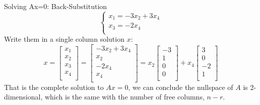 \documentclass{beamer}
\begin{document}
\begin{frame}{Solving Ax=0: Back-Substitution}
\begin{equation*}
    \begin{cases}
        x_1=-3x_2+3x_4\\
        x_3=-2x_4\\
    \end{cases}
\end{equation*}
Write them in a single column solution $x$:
\begin{equation*}
    x=\left[ \begin{array}{c}
        x_1\\
        x_2\\
        x_3\\
        x_4\\
    \end{array} \right] =\left[ \begin{array}{c}
        -3x_2+3x_4\\
        x_2\\
        -2x_4\\
        x_4\\
    \end{array} \right] =x_2\left[ \begin{array}{c}
        -3\\
        1\\
        0\\
        0\\
    \end{array} \right] +x_4\left[ \begin{array}{c}
        3\\
        0\\
        -2\\
        1\\
    \end{array} \right]
\end{equation*}
That is the complete solution to $Ax=0$, we can conclude the nullspace of $A$ is 2-dimensional, which is the same with the number of free columns, $n-r$.
\end{frame}
\end{document}
